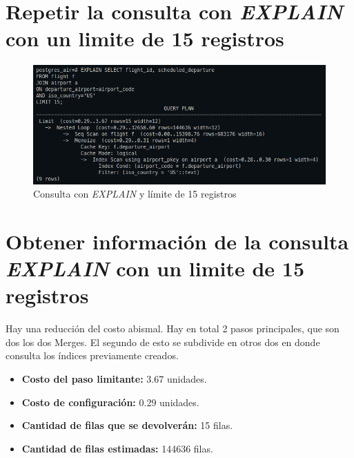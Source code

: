 \documentclass[11pt]{report}
\begin{document}
\section{Repetir la consulta con \emph{EXPLAIN} con un limite de 15 registros}
\begin{figure}[H]
  \centering
  \includegraphics[scale=0.55]{img/consulta_explain_limit.png}
  \caption{Consulta con \emph{EXPLAIN} y límite de 15 registros}
  \label{fig:consulta con EXPLAIN y límite de 15 registros}
\end{figure}


\section{Obtener información de la consulta \emph{EXPLAIN} con un limite de 15 registros}
Hay una reducción del costo abismal. Hay en total 2 pasos principales, que son dos los
dos Merges. El segundo de esto se subdivide en otros dos en donde consulta los índices
previamente creados.

\begin{itemize}
  \item \textbf{Costo del paso limitante:} 3.67 unidades.
  \item \textbf{Costo de configuración:}  0.29 unidades.
  \item \textbf{Cantidad de filas que se devolverán:} 15 filas.
  \item \textbf{Cantidad de filas estimadas:} 144636 filas.
\end{itemize}
\end{document}
